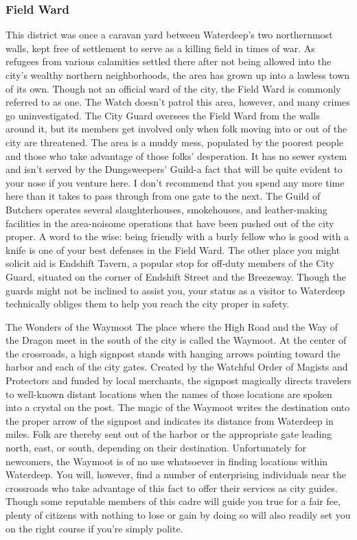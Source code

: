 \documentclass[10pt,a4paper,twoside,twocolumn,openany,nodeprecatedcode]{dndbook}
\begin{document}
\subsubsection{Field Ward}
This district was once a caravan yard between Waterdeep's two northernmost walls, kept free of settlement to serve as a killing field in times of war. As refugees from various calamities settled there after not being allowed into the city's wealthy northern neighborhoods, the area has grown up into a lawless town of its own.
Though not an official ward of the city, the Field Ward is commonly referred to as one. The Watch doesn't patrol this area, however, and many crimes go uninvestigated. The City Guard oversees the Field Ward from the walls around it, but its members get involved only when folk moving into or out of the city are threatened.
The area is a muddy mess, populated by the poorest people and those who take advantage of those folks' desperation. It has no sewer system and isn't served by the Dungsweepers' Guild-a fact that will be quite evident to your nose if you venture here. I don't recommend that you spend any more time here than it takes to pass through from one gate to the next.
The Guild of Butchers operates several slaughterhouses, smokehouses, and leather-making facilities in the area-noisome operations that have been pushed out of the city proper. A word to the wise: being friendly with a burly fellow who is good with a knife is one of your best defenses in the Field Ward. The other place you might solicit aid is Endshift Tavern, a popular stop for off-duty members of the City Guard, situated on the corner of Endshift Street and the Breezeway. Though the guards might not be inclined to assist you, your status as a visitor to Waterdeep technically obliges them to help you reach the city proper in safety.
\begin{DndComment}{The Wonders of the Waymoot}
The place where the High Road and the Way of the Dragon meet in the south of the city is called the Waymoot. At the center of the crossroads, a high signpost stands with hanging arrows pointing toward the harbor and each of the city gates. Created by the Watchful Order of Magists and Protectors and funded by local merchants, the signpost magically directs travelers to well-known distant locations when the names of those locations are spoken into a crystal on the post. The magic of the Waymoot writes the destination onto the proper arrow of the signpost and indicates its distance from Waterdeep in miles. Folk are thereby sent out of the harbor or the appropriate gate leading north, east, or south, depending on their destination.
Unfortunately for newcomers, the Waymoot is of no use whatsoever in finding locations within Waterdeep. You will, however, find a number of enterprising individuals near the crossroads who take advantage of this fact to offer their services as city guides. Though some reputable members of this cadre will guide you true for a fair fee, plenty of citizens with nothing to lose or gain by doing so will also readily set you on the right course if you're simply polite.
\end{DndComment}
\end{document}
